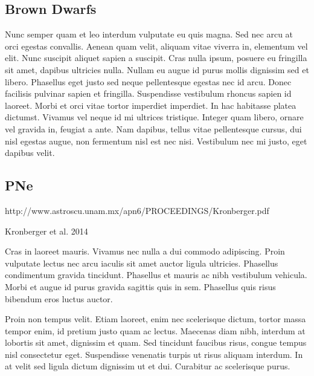 \documentclass[usenatbib]{mn2e}
\begin{document}
\subsection{Brown Dwarfs}
Nunc semper quam et leo interdum vulputate eu quis magna. Sed nec arcu at orci egestas convallis. Aenean quam velit, aliquam vitae viverra in, elementum vel elit. Nunc suscipit aliquet sapien a suscipit. Cras nulla ipsum, posuere eu fringilla sit amet, dapibus ultricies nulla. Nullam eu augue id purus mollis dignissim sed et libero. Phasellus eget justo sed neque pellentesque egestas nec id arcu. Donec facilisis pulvinar sapien et fringilla. Suspendisse vestibulum rhoncus sapien id laoreet. Morbi et orci vitae tortor imperdiet imperdiet. In hac habitasse platea dictumst. Vivamus vel neque id mi ultrices tristique. Integer quam libero, ornare vel gravida in, feugiat a ante. Nam dapibus, tellus vitae pellentesque cursus, dui nisl egestas augue, non fermentum nisl est nec nisi. Vestibulum nec mi justo, eget dapibus velit.

\subsection{PNe}
http://www.astroscu.unam.mx/apn6/PROCEEDINGS/Kronberger.pdf
	
Kronberger et al. 2014

Cras in laoreet mauris. Vivamus nec nulla a dui commodo adipiscing. Proin vulputate lectus nec arcu iaculis sit amet auctor ligula ultricies. Phasellus condimentum gravida tincidunt. Phasellus et mauris ac nibh vestibulum vehicula. Morbi et augue id purus gravida sagittis quis in sem. Phasellus quis risus bibendum eros luctus auctor.

Proin non tempus velit. Etiam laoreet, enim nec scelerisque dictum, tortor massa tempor enim, id pretium justo quam ac lectus. Maecenas diam nibh, interdum at lobortis sit amet, dignissim et quam. Sed tincidunt faucibus risus, congue tempus nisl consectetur eget. Suspendisse venenatis turpis ut risus aliquam interdum. In at velit sed ligula dictum dignissim ut et dui. Curabitur ac scelerisque purus.




\end{document}
